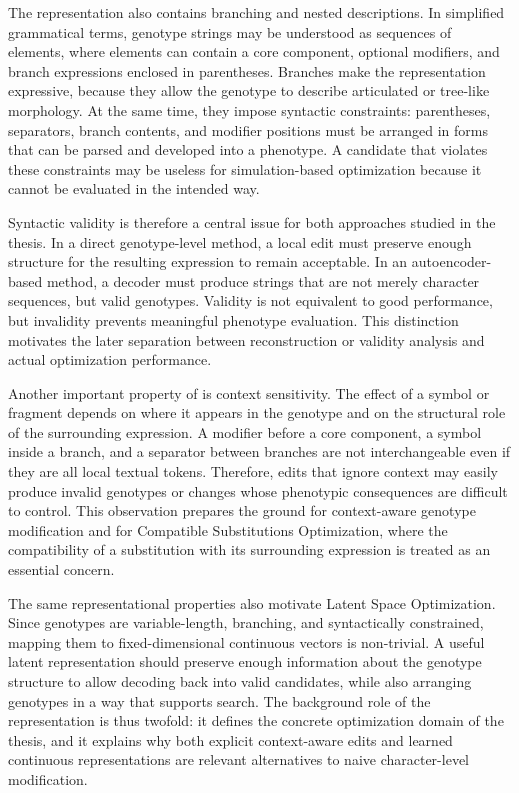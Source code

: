 The \fone{} representation also contains branching and nested descriptions. In simplified grammatical terms, genotype strings may be understood as sequences of elements, where elements can contain a core component, optional modifiers, and branch expressions enclosed in parentheses. Branches make the representation expressive, because they allow the genotype to describe articulated or tree-like morphology. At the same time, they impose syntactic constraints: parentheses, separators, branch contents, and modifier positions must be arranged in forms that can be parsed and developed into a phenotype. A candidate that violates these constraints may be useless for simulation-based optimization because it cannot be evaluated in the intended way.

Syntactic validity is therefore a central issue for both approaches studied in the thesis. In a direct genotype-level method, a local edit must preserve enough structure for the resulting expression to remain acceptable. In an autoencoder-based method, a decoder must produce strings that are not merely character sequences, but valid \fone{} genotypes. Validity is not equivalent to good performance, but invalidity prevents meaningful phenotype evaluation. This distinction motivates the later separation between reconstruction or validity analysis and actual optimization performance.

Another important property of \fone{} is context sensitivity. The effect of a symbol or fragment depends on where it appears in the genotype and on the structural role of the surrounding expression. A modifier before a core component, a symbol inside a branch, and a separator between branches are not interchangeable even if they are all local textual tokens. Therefore, edits that ignore context may easily produce invalid genotypes or changes whose phenotypic consequences are difficult to control. This observation prepares the ground for context-aware genotype modification and for Compatible Substitutions Optimization, where the compatibility of a substitution with its surrounding expression is treated as an essential concern.

The same representational properties also motivate Latent Space Optimization. Since \fone{} genotypes are variable-length, branching, and syntactically constrained, mapping them to fixed-dimensional continuous vectors is non-trivial. A useful latent representation should preserve enough information about the genotype structure to allow decoding back into valid candidates, while also arranging genotypes in a way that supports search. The background role of the \fone{} representation is thus twofold: it defines the concrete optimization domain of the thesis, and it explains why both explicit context-aware edits and learned continuous representations are relevant alternatives to naive character-level modification.

